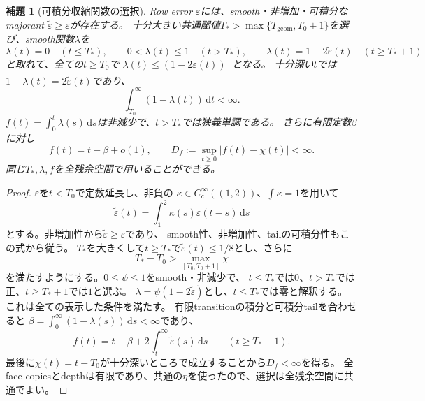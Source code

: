 \documentclass[11pt,a4paper]{ltjsarticle}
\newcommand{\dd}{\mathrm d}
\theoremstyle{plain}
\newtheorem{lemma}[lemma]{補題}
\theoremstyle{definition}
\theoremstyle{remark}
\begin{document}
\begin{lemma}[可積分収縮関数の選択]
\label{lem:lambda-choice}
Row error $\varepsilon$には、smooth・非増加・可積分なmajorant
$\widetilde\varepsilon\ge\varepsilon$が存在する。
十分大きい共通閾値$T_*>\max\{T_{\mathrm{geom}},T_0+1\}$を選び、smooth関数$\lambda$を
\[
 \lambda(t)=0\quad(t\le T_*),\qquad
 0<\lambda(t)\le1\quad(t>T_*),\qquad
 \lambda(t)=1-2\widetilde\varepsilon(t)\quad(t\ge T_*+1)
\]
と取れて、全ての$t\ge T_0$で
$\lambda(t)\le(1-2\varepsilon(t))_+$となる。
十分深い$t$では$1-\lambda(t)=2\widetilde\varepsilon(t)$であり、
\[
 \int_{T_0}^\infty(1-\lambda(t))\,\dd t<\infty.
\]
$f(t)=\int_0^t\lambda(s)\,\dd s$は非減少で、$t>T_*$では狭義単調である。
さらに有限定数$\beta$に対し
\begin{equation}
\label{eq:f-asymptotic}
 f(t)=t-\beta+o(1),\qquad
 D_f:=\sup_{t\ge0}|f(t)-\chi(t)|<\infty.
\end{equation}
同じ$T_*,\lambda,f$を全残余空間で用いることができる。
\end{lemma}
\begin{proof}
$\varepsilon$を$t<T_0$で定数延長し、非負の
$\kappa\in C_c^\infty((1,2))$、$\int\kappa=1$を用いて
\[
 \widetilde\varepsilon(t)=\int_1^2\kappa(s)\varepsilon(t-s)\,\dd s
\]
とする。非増加性から$\widetilde\varepsilon\ge\varepsilon$であり、
smooth性、非増加性、tailの可積分性もこの式から従う。
$T_*$を大きくして$t\ge T_*$で$\widetilde\varepsilon(t)\le1/8$とし、さらに
\[
 T_*-T_0>\max_{[T_0,T_0+1]}\chi
\]
を満たすようにする。$0\le\psi\le1$をsmooth・非減少で、
$t\le T_*$では$0$、$t>T_*$では正、$t\ge T_*+1$では$1$と選ぶ。
$\lambda=\psi(1-2\widetilde\varepsilon)$とし、$t\le T_*$では零と解釈する。
これは全ての表示した条件を満たす。
有限transitionの積分と可積分tailを合わせると
$\beta=\int_0^\infty(1-\lambda(s))\,\dd s<\infty$であり、
\[
 f(t)=t-\beta+2\int_t^\infty\widetilde\varepsilon(s)\,\dd s
 \qquad(t\ge T_*+1).
\]
最後に$\chi(t)=t-T_0$が十分深いところで成立することから$D_f<\infty$を得る。
全face copiesとdepthは有限であり、共通の$\eta$を使ったので、選択は全残余空間に共通でよい。
\end{proof}
\end{document}
